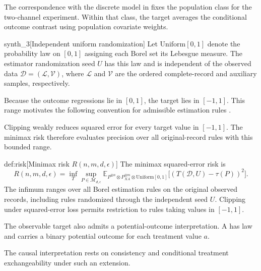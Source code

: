 \documentclass[11pt]{article}
\begin{document}
The correspondence with the discrete model in \citet[model (3)]{ZengBalakrishnanHanKennedy2026Discrete} fixes the population class for the two-channel experiment. Within that class, the target  averages the conditional outcome contrast using population covariate weights.

\begin{definitionv}{synth_3}[Independent uniform randomization]
Let \(\mathrm{Uniform}[0,1]\) denote the probability law on \([0,1]\) assigning each Borel set its Lebesgue measure. The estimator randomization seed \(U\) has this law and is independent of the observed data \(\mathcal D=(\mathcal L,\mathcal V)\), where \(\mathcal L\) and \(\mathcal V\) are the ordered complete-record and auxiliary samples, respectively.
\end{definitionv}

Because the outcome regressions lie in \([0,1]\), the target lies in \([-1,1]\). This range motivates the following convention for admissible estimation rules .



Clipping weakly reduces squared error for every target value in \([-1,1]\). The minimax risk  therefore evaluates precision over all original-record rules with this bounded range.

\begin{definitionv}{def:risk}[Minimax risk $R(n,m,d,\epsilon)$]
The minimax squared-error risk is
\[
R(n,m,d,\epsilon)
=
\inf_T\sup_{P\in\mathcal M_{d,\epsilon}}
\mathbb E_{P^{\otimes n}\otimes P_{XA}^{\otimes m}\otimes\mathrm{Uniform}[0,1]}
\bigl[(T(\mathcal D,U)-\tau(P))^2\bigr].
\]
The infimum ranges over all Borel estimation rules on the original observed records, including rules randomized through the independent seed \(U\). Clipping under squared-error loss permits restriction to rules taking values in \([-1,1]\).
\end{definitionv}

The observable target also admits a potential-outcome interpretation. A  has law  and carries a binary potential outcome  for each treatment value \(a\).



The causal interpretation rests on consistency and conditional treatment exchangeability under such an extension.
\end{document}
